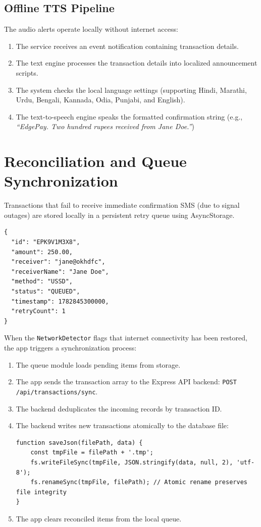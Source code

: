 \documentclass[10pt,journal,compsoc]{IEEEtran}
\begin{document}
\subsection{Offline TTS Pipeline}
The audio alerts operate locally without internet access:
\begin{enumerate}
    \item The service receives an event notification containing transaction details.
    \item The text engine processes the transaction details into localized announcement scripts.
    \item The system checks the local language settings (supporting Hindi, Marathi, Urdu, Bengali, Kannada, Odia, Punjabi, and English).
    \item The text-to-speech engine speaks the formatted confirmation string (e.g., \textit{``EdgePay. Two hundred rupees received from Jane Doe.''})
\end{enumerate}

\section{Reconciliation and Queue Synchronization}
Transactions that fail to receive immediate confirmation SMS (due to signal outages) are stored locally in a persistent retry queue using AsyncStorage.

\begin{lstlisting}[caption={Structure of a queued transaction awaiting sync.}]
{
  "id": "EPK9V1M3X8",
  "amount": 250.00,
  "receiver": "jane@okhdfc",
  "receiverName": "Jane Doe",
  "method": "USSD",
  "status": "QUEUED",
  "timestamp": 1782845300000,
  "retryCount": 1
}
\end{lstlisting}

When the \texttt{NetworkDetector} flags that internet connectivity has been restored, the app triggers a synchronization process:
\begin{enumerate}
    \item The queue module loads pending items from storage.
    \item The app sends the transaction array to the Express API backend: \texttt{POST /api/transactions/sync}.
    \item The backend deduplicates the incoming records by transaction ID.
    \item The backend writes new transactions atomically to the database file:
\begin{lstlisting}[caption={Atomic file write pattern in the backend sync server.}]
function saveJson(filePath, data) {
    const tmpFile = filePath + '.tmp';
    fs.writeFileSync(tmpFile, JSON.stringify(data, null, 2), 'utf-8');
    fs.renameSync(tmpFile, filePath); // Atomic rename preserves file integrity
}
\end{lstlisting}
    \item The app clears reconciled items from the local queue.
\end{enumerate}
\end{document}
